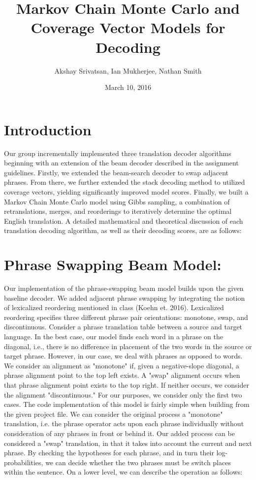 \documentclass[11pt]{article}
\begin{document}
\title{Markov Chain Monte Carlo and Coverage Vector Models for Decoding}
\author{Akshay Srivatsan, Ian Mukherjee, Nathan Smith}
\date{March 10, 2016}
\maketitle

\section{\textbf{Introduction}}
	Our group incrementally implemented three translation decoder algorithms beginning with an extension of the beam decoder described in the assignment guidelines. Firstly, we extended the beam-search decoder to swap adjacent phrases. From there, we further extended the stack decoding method to utilized coverage vectors, yielding significantly improved model scores. Finally,  we built a Markov Chain Monte Carlo model using Gibbs sampling, a combination of retranslations, merges, and reorderings to iteratively determine the optimal English translation. A detailed mathematical and theoretical discussion of each translation decoding algorithm, as well as their decoding scores, are as follows:

\section{\textbf{Phrase Swapping Beam Model:}}

	Our implementation of the phrase-swapping beam model builds upon the given baseline decoder. We added adjacent phrase swapping by integrating the notion of lexicalized reordering mentioned in class (Koehn et. 2016). Lexicalized reordering specifies three different phrase pair orientations: monotone, swap, and discontinuous. Consider a phrase translation table between a source and target language. In the best case, our model finds each word in a phrase on the diagonal, i.e., there is no difference in placement of the two words in the source or target phrase. However, in our case, we deal with phrases as opposed to words. We consider an alignment as "monotone" if, given a negative-slope diagonal, a phrase alignment point to the top left exists. A "swap" alignment occurs when that phrase alignment point exists to the top right. If neither occurs, we consider the alignment "discontinuous." For our purposes, we consider only the first two cases. The code implementation of this model is fairly simple when building from the given project file. We can consider the original process a "monotone" translation, i.e. the phrase operator acts upon each phrase individually without consideration of any phrases in front or behind it. Our added process can be considered a "swap" translation, in that it takes into account the current and next phrase. By checking the hypotheses for each phrase, and in turn their log-probabilities, we can decide whether the two phrases must be switch places within the sentence. On a lower level, we can describe the operation as follows:
	
\end{document}
